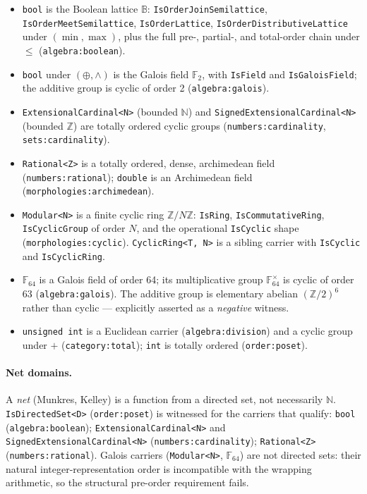 \documentclass[11pt, a4paper]{report}
\begin{document}
\begin{itemize}
  \item \texttt{bool} is the Boolean lattice $\mathbb{B}$: \texttt{IsOrderJoinSemilattice}, \texttt{IsOrderMeetSemilattice}, \texttt{IsOrderLattice}, \texttt{IsOrderDistributiveLattice} under $(\min, \max)$, plus the full pre-, partial-, and total-order chain under $\le$ (\texttt{algebra:boolean}).
  \item \texttt{bool} under $(\oplus, \wedge)$ is the Galois field $\mathbb{F}_2$, with \texttt{IsField} and \texttt{IsGaloisField}; the additive group is cyclic of order 2 (\texttt{algebra:galois}).
  \item \texttt{ExtensionalCardinal<N>} (bounded $\mathbb{N}$) and \texttt{SignedExtensionalCardinal<N>} (bounded $\mathbb{Z}$) are totally ordered cyclic groups (\texttt{numbers:cardinality}, \texttt{sets:cardinality}).
  \item \texttt{Rational<Z>} is a totally ordered, dense, archimedean field (\texttt{numbers:rational}); \texttt{double} is an Archimedean field (\texttt{morphologies:archimedean}).
  \item \texttt{Modular<N>} is a finite cyclic ring $\mathbb{Z}/N\mathbb{Z}$: \texttt{IsRing}, \texttt{IsCommutativeRing}, \texttt{IsCyclicGroup} of order $N$, and the operational \texttt{IsCyclic} shape (\texttt{morphologies:cyclic}). \texttt{CyclicRing<T, N>} is a sibling carrier with \texttt{IsCyclic} and \texttt{IsCyclicRing}.
  \item $\mathbb{F}_{64}$ is a Galois field of order 64; its multiplicative group $\mathbb{F}_{64}^{\times}$ is cyclic of order 63 (\texttt{algebra:galois}). The additive group is elementary abelian $(\mathbb{Z}/2)^6$ rather than cyclic --- explicitly asserted as a \emph{negative} witness.
  \item \texttt{unsigned int} is a Euclidean carrier (\texttt{algebra:division}) and a cyclic group under $+$ (\texttt{category:total}); \texttt{int} is totally ordered (\texttt{order:poset}).
\end{itemize}

\paragraph{Net domains.}
A \emph{net} (Munkres, Kelley) is a function from a directed set, not necessarily $\mathbb{N}$. \texttt{IsDirectedSet<D>} (\texttt{order:poset}) is witnessed for the carriers that qualify: \texttt{bool} (\texttt{algebra:boolean}); \texttt{ExtensionalCardinal<N>} and \texttt{SignedExtensionalCardinal<N>} (\texttt{numbers:cardinality}); \texttt{Rational<Z>} (\texttt{numbers:rational}). Galois carriers (\texttt{Modular<N>}, $\mathbb{F}_{64}$) are not directed sets: their natural integer-representation order is incompatible with the wrapping arithmetic, so the structural pre-order requirement fails.
\end{document}
